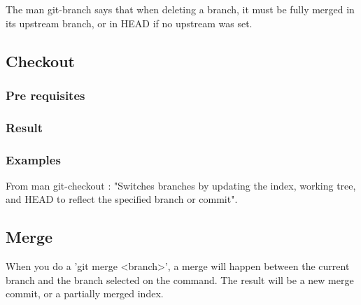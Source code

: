 The man git-branch says that when deleting a branch, it must be fully
merged in its upstream branch, or in HEAD if no upstream was set. \par


\subsection{Checkout}

\subsubsection{Pre requisites}

\subsubsection{Result}

\subsubsection{Examples}
From man git-checkout : "Switches branches by updating the index, 
working tree, and HEAD to reflect the specified branch or commit". \par

\subsection{Merge}


When you do a 'git merge <branch>', a merge will happen between the current
branch and the branch selected on the command. The result will be a new merge 
commit, or a partially merged index. \par

